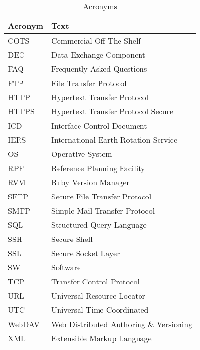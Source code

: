 \documentclass[dec_sum_main.tex]{subfiles}
\begin{document}
\begin{longtable}{|m{2.8cm}|m{10cm}|}
	\caption{Acronyms\label{long}} \\
    \hline
	\textbf{Acronym} & \textbf{Text} \\
	\hline
	COTS & Commercial Off The Shelf \\ \hline
	DEC & Data Exchange Component \\ \hline
	FAQ & Frequently Asked Questions \\ \hline
	FTP & File Transfer Protocol \\ \hline
	HTTP & Hypertext Transfer Protocol \\ \hline
	HTTPS & Hypertext Transfer Protocol Secure\\ \hline
	ICD & Interface Control Document \\ \hline
	IERS & International Earth Rotation Service \\ \hline
	OS & Operative System \\ \hline
	RPF & Reference Planning Facility \\ \hline
	RVM & Ruby Version Manager \\ \hline
	SFTP & Secure File Transfer Protocol \\ \hline
	SMTP & Simple Mail Transfer Protocol \\ \hline
	SQL & Structured Query Language \\ \hline
	SSH & Secure Shell \\ \hline
	SSL & Secure Socket Layer \\ \hline
	SW & Software \\ \hline
	TCP & Transfer Control Protocol \\ \hline
	URL & Universal Resource Locator \\ \hline
	UTC & Universal Time Coordinated \\ \hline
	WebDAV & Web Distributed Authoring \& Versioning \\ \hline
	XML & Extensible Markup Language \\ \hline						
\end{longtable}
\end{document}
